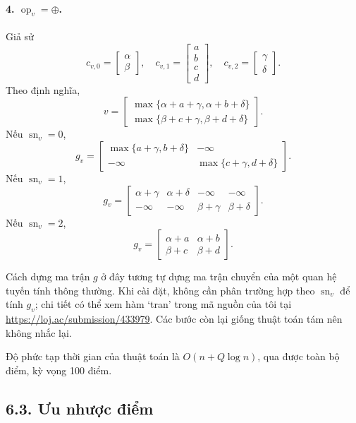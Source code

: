 \documentclass[11pt]{article}
\begin{document}
\paragraph{4. \(\operatorname{op}_v=\oplus\).}
Giả sử
\[
c_{v,0}=\begin{bmatrix}\alpha\\\beta\end{bmatrix},\quad
c_{v,1}=\begin{bmatrix}a\\b\\c\\d\end{bmatrix},\quad
c_{v,2}=\begin{bmatrix}\gamma\\\delta\end{bmatrix}.
\]
Theo định nghĩa,
\[
v=\begin{bmatrix}
\max\{\alpha+a+\gamma,\alpha+b+\delta\}\\
\max\{\beta+c+\gamma,\beta+d+\delta\}
\end{bmatrix}.
\]
Nếu \(\operatorname{sn}_v=0\),
\[
g_v=
\begin{bmatrix}
\max\{a+\gamma,b+\delta\}&-\infty\\
-\infty&\max\{c+\gamma,d+\delta\}
\end{bmatrix}.
\]
Nếu \(\operatorname{sn}_v=1\),
\[
g_v=
\begin{bmatrix}
\alpha+\gamma&\alpha+\delta&-\infty&-\infty\\
-\infty&-\infty&\beta+\gamma&\beta+\delta
\end{bmatrix}.
\]
Nếu \(\operatorname{sn}_v=2\),
\[
g_v=
\begin{bmatrix}
\alpha+a&\alpha+b\\
\beta+c&\beta+d
\end{bmatrix}.
\]

Cách dựng ma trận \(g\) ở đây tương tự dựng ma trận chuyển của một quan hệ
tuyến tính thông thường. Khi cài đặt, không cần phân trường hợp theo
\(\operatorname{sn}_v\) để tính \(g_v\); chi tiết có thể xem hàm `tran' trong
mã nguồn của tôi tại \url{https://loj.ac/submission/433979}. Các bước còn lại
giống thuật toán tám nên không nhắc lại.

Độ phức tạp thời gian của thuật toán là \(O(n+Q\log n)\), qua được toàn bộ
điểm, kỳ vọng 100 điểm.

\subsection*{6.3. Ưu nhược điểm}
\end{document}
